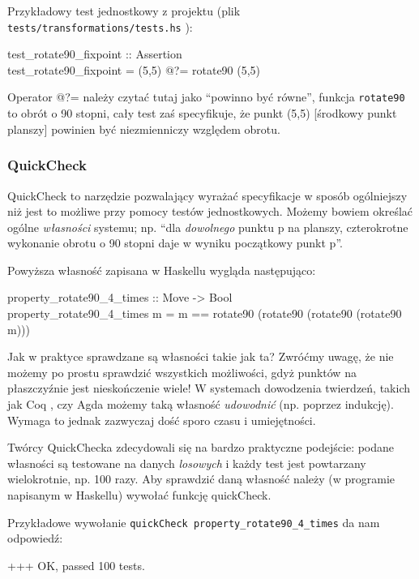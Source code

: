 \documentclass[10pt,leqno]{article}
\newcommand{\cmd}[1]{
  \texttt{#1}
}
\begin{document}
Przykładowy test jednostkowy z projektu (plik \cmd{tests/transformations/tests.hs}):

\begin{framed}
\noindent test\_rotate90\_fixpoint :: Assertion \\
test\_rotate90\_fixpoint = (5,5) @?= rotate90 (5,5)
\end{framed}

Operator @?= należy czytać tutaj jako ``powinno być równe'', funkcja \cmd{rotate90} to
obrót o 90 stopni, cały test zaś specyfikuje, że punkt (5,5) [środkowy punkt planszy]
powinien być niezmienniczy względem obrotu.

\subsubsection{QuickCheck}

QuickCheck to narzędzie pozwalający wyrażać specyfikacje w sposób ogólniejszy niż 
jest to możliwe przy pomocy testów jednostkowych. Możemy bowiem określać ogólne 
\emph{własności} systemu; np. ``dla \emph{dowolnego} punktu p na planszy, czterokrotne
wykonanie obrotu o 90 stopni daje w wyniku początkowy punkt p''.

Powyższa własność zapisana w Haskellu wygląda następująco:

\begin{framed}
\noindent property\_rotate90\_4\_times :: Move -> Bool \\
property\_rotate90\_4\_times m = m == rotate90 (rotate90 (rotate90 (rotate90 m))) 
\end{framed}

Jak w praktyce sprawdzane są własności takie jak ta? Zwróćmy uwagę, że nie możemy po
prostu sprawdzić wszystkich możliwości, gdyż punktów na płaszczyźnie jest nieskończenie
wiele! W systemach dowodzenia twierdzeń, takich jak Coq \cite{coq}, czy Agda \cite{agda}
możemy taką własność \emph{udowodnić} (np. poprzez indukcję). Wymaga to jednak zazwyczaj
dość sporo czasu i umiejętności. 

Twórcy QuickChecka zdecydowali się na bardzo praktyczne podejście: podane własności są
testowane na danych \emph{losowych} i każdy test jest powtarzany wielokrotnie, np. 100 razy.
Aby sprawdzić daną własność należy (w programie napisanym w Haskellu) wywołać funkcję quickCheck.

Przykładowe wywołanie \cmd{quickCheck property\_rotate90\_4\_times} da nam odpowiedź:

\begin{framed}
\noindent +++ OK, passed 100 tests.
\end{framed}
\end{document}
